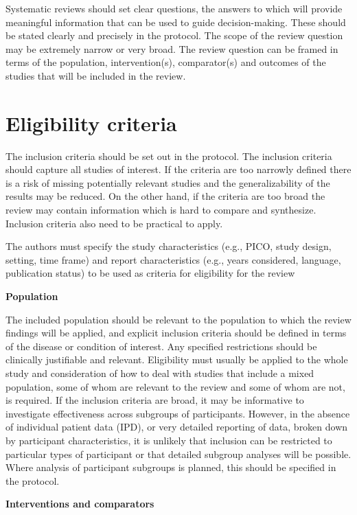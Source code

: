 \documentclass[
  10pt,
  a4paper,
  DIV=11,
  numbers=noendperiod]{scrreprt}
\begin{document}
Systematic reviews should set clear questions, the answers to which will
provide meaningful information that can be used to guide
decision-making. These should be stated clearly and precisely in the
protocol. The scope of the review question may be extremely narrow or
very broad. The review question can be framed in terms of the
population, intervention(s), comparator(s) and outcomes of the studies
that will be included in the review.

\section{Eligibility criteria}\label{eligibility-criteria}

The inclusion criteria should be set out in the protocol. The inclusion
criteria should capture all studies of interest. If the criteria are too
narrowly defined there is a risk of missing potentially relevant studies
and the generalizability of the results may be reduced. On the other
hand, if the criteria are too broad the review may contain information
which is hard to compare and synthesize. Inclusion criteria also need to
be practical to apply.

The authors must specify the study characteristics (e.g., PICO, study
design, setting, time frame) and report characteristics (e.g., years
considered, language, publication status) to be used as criteria for
eligibility for the review

\textbf{Population}

The included population should be relevant to the population to which
the review findings will be applied, and explicit inclusion criteria
should be defined in terms of the disease or condition of interest. Any
specified restrictions should be clinically justifiable and relevant.
Eligibility must usually be applied to the whole study and consideration
of how to deal with studies that include a mixed population, some of
whom are relevant to the review and some of whom are not, is required.
If the inclusion criteria are broad, it may be informative to
investigate effectiveness across subgroups of participants. However, in
the absence of individual patient data (IPD), or very detailed reporting
of data, broken down by participant characteristics, it is unlikely that
inclusion can be restricted to particular types of participant or that
detailed subgroup analyses will be possible. Where analysis of
participant subgroups is planned, this should be specified in the
protocol.

\textbf{Interventions and comparators}
\end{document}

